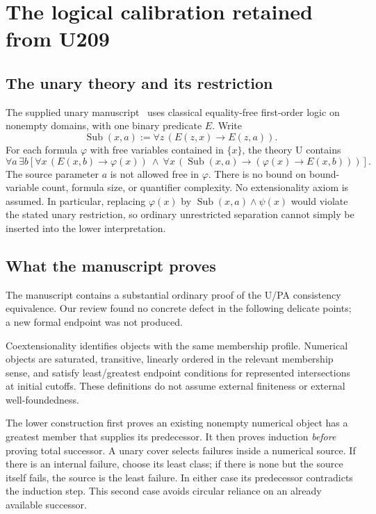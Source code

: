 \documentclass[11pt,letterpaper]{article}
\newcommand{\Sub}{\operatorname{Sub}}
\begin{document}
\section{The logical calibration retained from U209}
\label{sec:calibration}

\subsection{The unary theory and its restriction}

The supplied unary manuscript~\cite{incoming} uses classical equality-free first-order
logic on nonempty domains, with one binary predicate \(E\). Write
\[
\Sub(x,a):=\forall z\,(E(z,x)\to E(z,a)).
\]
For each formula \(\varphi\) with free variables contained in \(\{x\}\),
the theory U contains
\[
\forall a\,\exists b\left[
\forall x\,(E(x,b)\to\varphi(x))\ \land\
\forall x\,(\Sub(x,a)\to(\varphi(x)\to E(x,b)))\right].
\tag{U}
\]
The source parameter \(a\) is not allowed free in \(\varphi\).
There is no bound on bound-variable count, formula size, or quantifier
complexity. No extensionality axiom is assumed. In particular, replacing
\(\varphi(x)\) by \(\Sub(x,a)\land\psi(x)\) would violate the stated
unary restriction, so ordinary unrestricted separation cannot simply be
inserted into the lower interpretation.

\subsection{What the manuscript proves}

The manuscript contains a substantial ordinary proof of the U/PA
consistency equivalence. Our review found no concrete defect in the
following delicate points; a new formal endpoint was not produced.

Coextensionality identifies objects with the same membership profile.
Numerical objects are saturated, transitive, linearly ordered in the
relevant membership sense, and satisfy least/greatest endpoint conditions
for represented intersections at initial cutoffs. These definitions do
not assume external finiteness or external well-foundedness.

The lower construction first proves an existing nonempty numerical object
has a greatest member that supplies its predecessor. It then proves
induction \emph{before} proving total successor. A unary cover selects
failures inside a numerical source. If there is an internal failure,
choose its least class; if there is none but the source itself fails,
the source is the least failure. In either case its predecessor contradicts
the induction step. This second case avoids circular reliance on an
already available successor.
\end{document}
